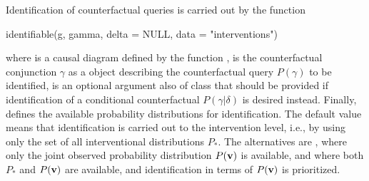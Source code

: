 Identification of counterfactual queries is carried out by the function 
\begin{example}
identifiable(g, gamma, delta = NULL, data = "interventions") 
\end{example}
where  is a causal diagram defined by the function ,  is the counterfactual conjunction \(\gamma\) as a  object describing the counterfactual query \(P(\gamma)\) to be identified,  is an optional argument also of class  that should be provided if identification of a conditional counterfactual \(P(\gamma|\delta)\) is desired instead. Finally,  defines the available probability distributions for identification. The default value  means that identification is carried out to the intervention level, i.e., by using only the set of all interventional distributions \(P_*\). The alternatives are , where only the joint observed probability distribution \(P(\mathbf{v})\) is available, and  where both \(P_*\) and \(P(\mathbf{v})\) are available, and identification in terms of \(P(\mathbf{v})\) is prioritized.

